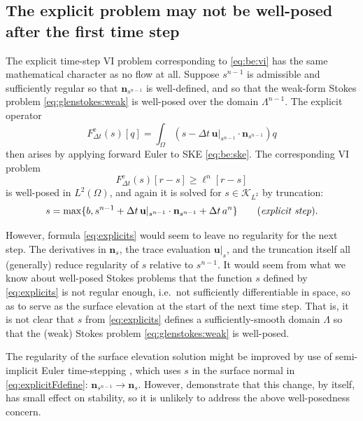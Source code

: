 \documentclass[hidelinks,onefignum,onetabnum,final]{siamart220329}  %
\newcommand{\bn}{\mathbf{n}}
\newcommand{\bu}{\mathbf{u}}
\newcommand{\cK}{\mathcal{K}}
\begin{document}
\subsection{The explicit problem may not be well-posed after the first time step} \label{subsec:explicit}   The explicit time-step VI problem corresponding to \eqref{eq:be:vi} has the same mathematical character as no flow at all.  Suppose $s^{n-1}$ is admissible and sufficiently regular so that $\bn_{s^{n-1}}$ is well-defined, and so that the weak-form Stokes problem \eqref{eq:glenstokes:weak} is well-posed over the domain $\Lambda^{n-1}$.  The explicit operator
\begin{equation}
F^{\text{e}}_{\Delta t}(s)[q] = \int_\Omega \left(s - \Delta t\, \bu|_{s^{n-1}} \cdot \bn_{s^{n-1}}\right) q  \label{eq:explicitFdefine}
\end{equation}
then arises by applying forward Euler to SKE \eqref{eq:be:ske}.  The corresponding VI problem
\begin{equation}
F^{\text{e}}_{\Delta t}(s)[r-s] \ge \ell^n[r-s]
\end{equation}
is well-posed in $L^2(\Omega)$, and again it is solved for $s \in \cK_{L^2}$ by truncation:
\begin{equation}
s = \max\{b, s^{n-1} + \Delta t\, \bu|_{s^{n-1}} \cdot \bn_{s^{n-1}} + \Delta t\,a^n\} \qquad (\text{\emph{explicit step}}). \label{eq:explicits}
\end{equation}

However, formula \eqref{eq:explicits} would seem to leave no regularity for the next step.  The derivatives in $\bn_{s}$, the trace evaluation $\bu|_{s}$, and the truncation itself all (generally) reduce regularity of $s$ relative to $s^{n-1}$.  It would seem from what we know about well-posed Stokes problems that the function $s$ defined by \eqref{eq:explicits} is not regular enough, i.e.~not sufficiently differentiable in space, so as to serve as the surface elevation at the start of the next time step.  That is, it is not clear that $s$ from \eqref{eq:explicits} defines a sufficiently-smooth domain $\Lambda$ so that the (weak) Stokes problem \eqref{eq:glenstokes:weak} is well-posed.

The regularity of the surface elevation solution might be improved by use of semi-implicit Euler time-stepping  \cite{LofgrenAhlkronaHelanow2022}, which uses $s$ in the surface normal in \eqref{eq:explicitFdefine}: $\bn_{s^{n-1}} \to \bn_s$.  However, \cite{LofgrenAhlkronaHelanow2022} demonstrate that this change, by itself, has small effect on stability, so it is unlikely to address the above well-posedness concern.
\end{document}
